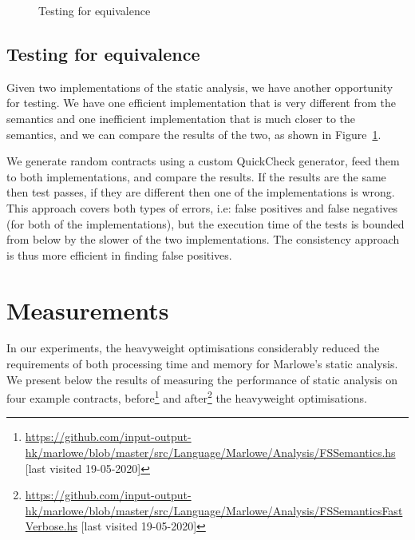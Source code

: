 \documentclass[english,runningheads]{llncs}
\begin{document}
\begin{figure}[h]
\begin{minipage}{.4\textwidth}
\begin{centering}
    \par\end{centering}
    \caption{Testing for equivalence\label{fig:Property-based-testing-for-equivalence}}
\end{minipage}
\end{figure}

\vspace*{-5mm}

\subsection{Testing for equivalence\label{subsec:Testing-for-equivalence} }

Given two  implementations of the static analysis, we have another opportunity
for testing. We have one efficient implementation that
is very different from the semantics and one inefficient implementation
that is much closer to the semantics, and we can compare the results of the
two, as shown in Figure~\ref{fig:Property-based-testing-for-equivalence}.

We generate random contracts using a custom QuickCheck \cite{quickcheck} generator,
 feed them to both implementations, and compare the results.
If the results are the same then test passes, if they are different then
one of the implementations is wrong.
This approach covers both types of errors, i.e: false positives and
false negatives (for both of the implementations), but the execution
time of the tests is bounded from below by the slower of the two implementations.
The consistency approach is thus more efficient in finding false positives.

\section{Measurements \label{sec:Measurements} }

In our experiments, the heavyweight optimisations considerably reduced
the requirements of both processing time and memory for Marlowe's static
analysis. %
We present below the results of measuring the performance of static analysis on
four example  contracts,
before\footnote{\url{https://github.com/input-output-hk/marlowe/blob/master/src/Language/Marlowe/Analysis/FSSemantics.hs} [last visited 19-05-2020]}
and after\footnote{\url{https://github.com/input-output-hk/marlowe/blob/master/src/Language/Marlowe/Analysis/FSSemanticsFastVerbose.hs} [last visited 19-05-2020]}
the heavyweight optimisations.
\end{document}
